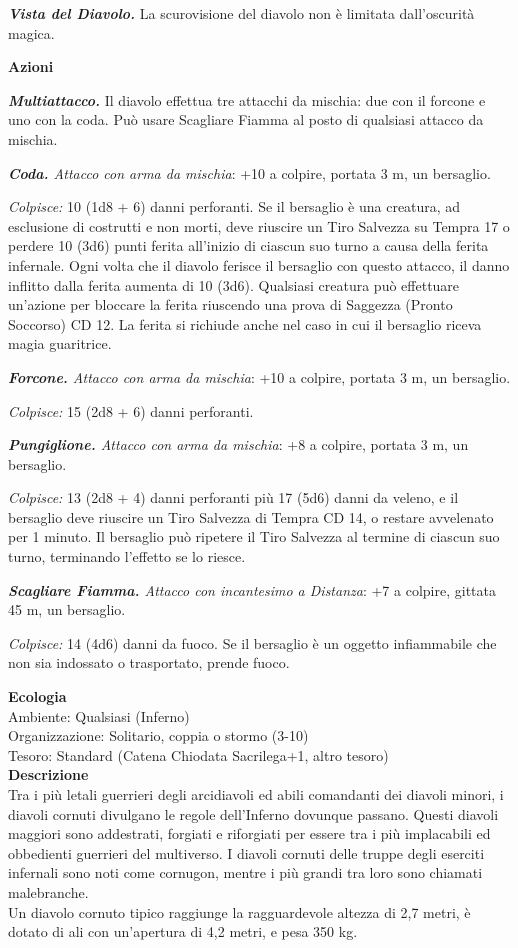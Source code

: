 \begin{multicols}{2}
\emph{\textbf{Vista del Diavolo.}} La scurovisione del diavolo non è limitata dall'oscurità magica.

\textbf{Azioni}

\emph{\textbf{Multiattacco.}} Il diavolo effettua tre attacchi da mischia: due con il forcone e uno con la coda. Può usare Scagliare Fiamma al posto di qualsiasi attacco da mischia.

\emph{\textbf{Coda.} Attacco con arma da mischia}: +10 a colpire, portata 3 m, un bersaglio.

\emph{Colpisce:} 10 (1d8 + 6) danni perforanti. Se il bersaglio è una creatura, ad esclusione di costrutti e non morti, deve riuscire un Tiro Salvezza su Tempra 17 o perdere 10 (3d6) punti ferita all'inizio di ciascun suo turno a causa della ferita infernale. Ogni volta che il diavolo ferisce il bersaglio con questo attacco, il danno inflitto dalla ferita aumenta di 10 (3d6). Qualsiasi creatura può effettuare un'azione per bloccare la ferita riuscendo una prova di Saggezza (Pronto Soccorso) CD 12. La ferita si richiude anche nel caso in cui il bersaglio riceva magia guaritrice.

\emph{\textbf{Forcone.} Attacco con arma da mischia}: +10 a colpire, portata 3 m, un bersaglio.

\emph{Colpisce:} 15 (2d8 + 6) danni perforanti.

\emph{\textbf{Pungiglione.} Attacco con arma da mischia}: +8 a colpire, portata 3 m, un bersaglio.

\emph{Colpisce:} 13 (2d8 + 4) danni perforanti più 17 (5d6) danni da veleno, e il bersaglio deve riuscire un Tiro Salvezza di Tempra CD 14, o restare avvelenato per 1 minuto. Il bersaglio può ripetere il Tiro Salvezza al termine di ciascun suo turno, terminando l'effetto se lo
riesce.

\emph{\textbf{Scagliare Fiamma.} Attacco con incantesimo a Distanza}: +7 a colpire, gittata 45 m, un bersaglio.

\emph{Colpisce:} 14 (4d6) danni da fuoco. Se il bersaglio è un oggetto infiammabile che non sia indossato o trasportato, prende fuoco.

\textbf{Ecologia}\\
Ambiente: Qualsiasi (Inferno)\\
Organizzazione: Solitario, coppia o stormo (3-10)\\
Tesoro: Standard (Catena Chiodata Sacrilega+1, altro tesoro)\\
\textbf{Descrizione}\\
Tra i più letali guerrieri degli arcidiavoli ed abili comandanti dei diavoli minori, i diavoli cornuti divulgano le regole dell'Inferno dovunque passano. Questi diavoli maggiori sono addestrati, forgiati e riforgiati per essere tra i più implacabili ed obbedienti guerrieri del multiverso. I diavoli cornuti delle truppe degli eserciti infernali sono noti come cornugon, mentre i più grandi tra loro sono chiamati malebranche.\\
Un diavolo cornuto tipico raggiunge la ragguardevole altezza di 2,7 metri, è dotato di ali con un'apertura di 4,2 metri, e pesa 350 kg.\\



\end{multicols}
